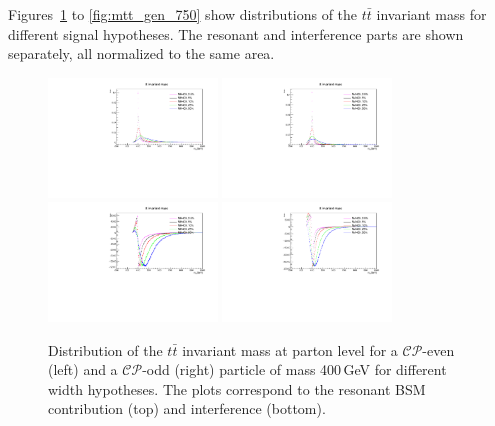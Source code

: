Figures~\ref{fig:mtt_gen_400} to \ref{fig:mtt_gen_750} show distributions of the $t\bar t$ invariant mass for different signal hypotheses.
The resonant and interference parts are shown separately, all normalized to the same area.
\begin{figure} \centering
  \includegraphics[width=0.4\textwidth]{fig/chapt4/gen_plots/H_res_ljets_M400.pdf}
  \includegraphics[width=0.4\textwidth]{fig/chapt4/gen_plots/A_res_ljets_M400.pdf}\\
  \includegraphics[width=0.4\textwidth]{fig/chapt4/gen_plots/H_int_ljets_M400.pdf}
  \includegraphics[width=0.4\textwidth]{fig/chapt4/gen_plots/A_int_ljets_M400.pdf}\\
  \caption{Distribution of the $t\bar t$ invariant mass at parton level for a $\mathcal{CP}$-even (left) and a $\mathcal{CP}$-odd (right) particle of mass 400\,GeV for different width hypotheses. The plots correspond to the resonant BSM contribution (top) and interference (bottom).}
  \label{fig:mtt_gen_400}
\end{figure}

